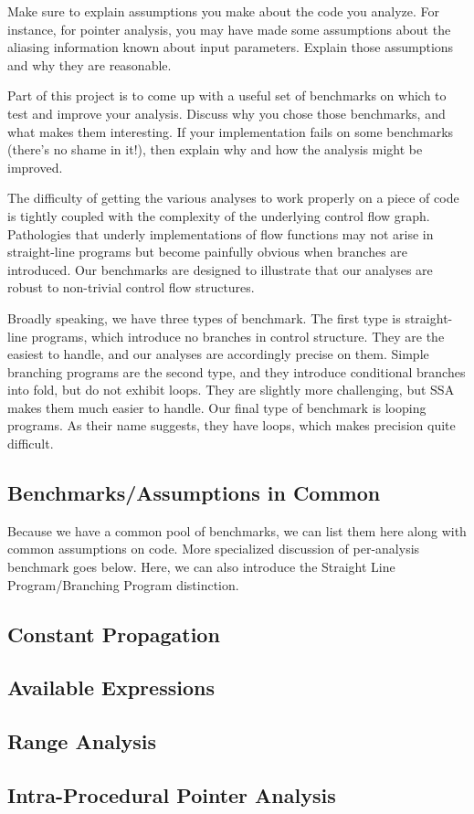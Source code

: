 \documentclass{article}
\theoremstyle{definition}
\begin{document}
\begin{framed}
  Make sure to explain assumptions you make about the code you
  analyze. For instance, for pointer analysis, you may have made some
  assumptions about the aliasing information known about input
  parameters. Explain those assumptions and why they are reasonable.

  Part of this project is to come up with a useful set of benchmarks
  on which to test and improve your analysis. Discuss why you chose
  those benchmarks, and what makes them interesting. If your
  implementation fails on some benchmarks (there's no shame in it!),
  then explain why and how the analysis might be improved.
\end{framed}

The difficulty of getting the various analyses to work properly on a piece of code is tightly coupled with the complexity of the underlying control flow graph. Pathologies that underly implementations of flow functions may not arise in straight-line programs but become painfully obvious when branches are introduced. Our benchmarks are designed to illustrate that our analyses are robust to non-trivial control flow structures.

Broadly speaking, we have three types of benchmark. The first type is straight-line programs, which introduce no branches in control structure. They are the easiest to handle, and our analyses are accordingly precise on them. Simple branching programs are the second type, and they introduce conditional branches into fold, but do not exhibit loops. They are slightly more challenging, but SSA makes them much easier to handle. Our final type of benchmark is looping programs. As their name suggests, they have loops, which makes precision quite difficult.

\subsection{Benchmarks/Assumptions in Common}
Because we have a common pool of benchmarks, we can list them here
along with common assumptions on code. More specialized discussion of
per-analysis benchmark goes below. Here, we can also introduce the
Straight Line Program/Branching Program distinction.

\subsection{Constant Propagation}
\subsection{Available Expressions}
\subsection{Range Analysis}
\subsection{Intra-Procedural Pointer Analysis}
\end{document}
